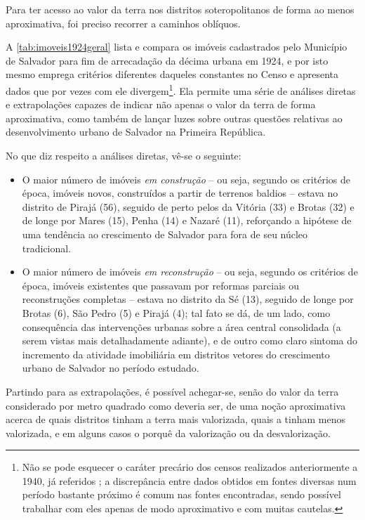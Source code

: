 Para ter acesso ao valor da terra nos distritos soteropolitanos de forma ao menos aproximativa, foi preciso recorrer a caminhos oblíquos.

A \autoref{tab:imoveis1924geral} lista e compara os imóveis cadastrados pelo Município de Salvador para fim de arrecadação da décima urbana em 1924, e por isto mesmo emprega critérios diferentes daqueles constantes no Censo e apresenta dados que por vezes com ele divergem\footnote{Não se pode esquecer o caráter precário dos censos realizados anteriormente a 1940, já referidos \cite{oliveirasimoes_censos_2005, reisetal_areascensos_2011}; a discrepância entre dados obtidos em fontes diversas num período bastante próximo é comum nas fontes encontradas, sendo possível trabalhar com eles apenas de modo aproximativo e com muitas cautelas.}. Ela permite uma série de análises diretas e extrapolações capazes de indicar não apenas o valor da terra de forma aproximativa, como também de lançar luzes sobre outras questões relativas ao desenvolvimento urbano de Salvador na Primeira República.



No que diz respeito a análises diretas, vê-se o seguinte:

\begin{itemize}
\item O maior número de imóveis \textit{em construção} -- ou seja, segundo os critérios de época, imóveis novos, construídos a partir de terrenos baldios -- estava no distrito de Pirajá (56), seguido de perto pelos da Vitória (33) e Brotas (32) e de longe por Mares (15), Penha (14) e Nazaré (11), reforçando a hipótese de uma tendência ao crescimento de Salvador para fora de seu núcleo tradicional.
\item O maior número de imóveis \textit{em reconstrução} -- ou seja, segundo os critérios de época, imóveis existentes que passavam por reformas parciais ou reconstruções completas -- estava no distrito da Sé (13), seguido de longe por Brotas (6), São Pedro (5) e Pirajá (4); tal fato se dá, de um lado, como consequência das intervenções urbanas sobre a área central consolidada (a serem vistas mais detalhadamente adiante), e de outro como claro sintoma do incremento da atividade imobiliária em distritos vetores do crescimento urbano de Salvador no período estudado.
\end{itemize}

Partindo para as extrapolações, é possível achegar-se, senão do valor da terra considerado por metro quadrado como deveria ser, de uma noção aproximativa acerca de quais distritos tinham a terra mais valorizada, quais a tinham menos valorizada, e em alguns casos o porquê da valorização ou da desvalorização.

